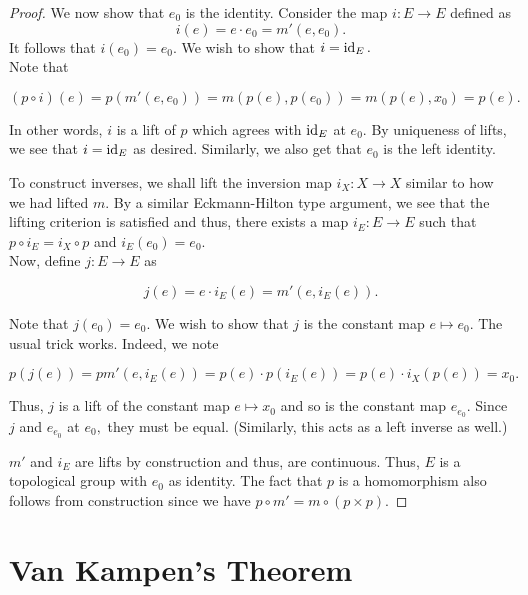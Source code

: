\documentclass[12pt]{article}
\begin{document}
\begin{proof}
	We now show that $e_0$ is the identity. Consider the map $i:E \to E$ defined as
	\begin{equation*} 
		i(e) = e\cdot e_0 = m'(e, e_0).
	\end{equation*}
	It follows that $i(e_0) = e_0.$ We wish to show that $i = \operatorname{id}_E.$ \\
	Note that
	
	\begin{equation*} 
		(p\circ i)(e) = p(m'(e, e_0)) = m(p(e), p(e_0)) = m(p(e), x_0) = p(e).
	\end{equation*}
	
	In other words, $i$ is a lift of $p$ which agrees with $\operatorname{id}_E$ at $e_0.$ By uniqueness of lifts, we see that $i = \operatorname{id}_E$ as desired. Similarly, we also get that $e_0$ is the left identity.

	To construct inverses, we shall lift the inversion map $i_X:X \to X$ similar to how we had lifted $m.$ By a similar Eckmann-Hilton type argument, we see that the lifting criterion is satisfied and thus, there exists a map $i_E:E \to E$ such that $p\circ i_E = i_X\circ p$ and $i_E(e_0) = e_0.$\\
	Now, define $j:E \to E$ as
	
	\begin{equation*} 
		j(e) = e\cdot i_E(e) = m'(e, i_E(e)).
	\end{equation*}

	Note that $j(e_0) = e_0.$ We wish to show that $j$ is the constant map $e\mapsto e_0.$ The usual trick works. Indeed, we note

	\begin{equation*} 
		p(j(e)) = pm'(e, i_E(e)) = p(e)\cdot p(i_E(e)) = p(e)\cdot i_X(p(e)) = x_0.
	\end{equation*}

	Thus, $j$ is a lift of the constant map $e \mapsto x_0$ and so is the constant map $e_{e_0}.$ Since $j$ and $e_{e_0}$ at $e_0,$ they must be equal. (Similarly, this acts as a left inverse as well.)

	$m'$ and $i_E$ are lifts by construction and thus, are continuous. Thus, $E$ is a topological group with $e_0$ as identity. The fact that $p$ is a homomorphism also follows from construction since we have $p\circ m' = m\circ(p\times p).$
\end{proof}

\section{Van Kampen's Theorem} \label{sec:vankampen}
\end{document}
